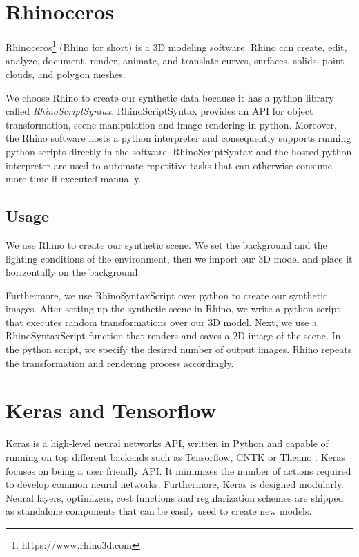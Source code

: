 \section{Rhinoceros}\label{sec:rhino}
Rhinoceros\footnote{https://www.rhino3d.com} (Rhino for short) is a 3D modeling software. Rhino can create, edit, analyze, document, render, animate, and translate curves, surfaces, solids, point clouds, and polygon meshes.

We choose Rhino to create our synthetic data because it has a python library called \textit{RhinoScriptSyntax}. RhinoScriptSyntax provides an API for object transformation, scene manipulation and image rendering in python. Moreover, the Rhino software hosts a python interpreter and consequently supports running python scripts directly in the software. RhinoScriptSyntax and the hosted python interpreter are used to automate repetitive tasks that can otherwise consume more time if executed manually.

\subsection{Usage}
We use Rhino to create our synthetic scene. We set the background and the lighting conditions of the environment, then we import our 3D model and place it horizontally on the background.

Furthermore, we use RhinoSyntaxScript over python to create our synthetic images. After setting up the synthetic scene in Rhino, we write a python script that executes random transformations over our 3D model. Next, we use a RhinoSyntaxScript function that renders and saves a 2D image of the scene. In the python script, we specify the desired number of output images. Rhino repeats the transformation and rendering process accordingly.

\section{Keras and Tensorflow}\label{sec:keras}
Keras is a high-level neural networks API, written in Python and capable of running on top different backends such as Tensorflow, CNTK or Theano \cite{chollet2015keras}. Keras focuses on being a user friendly API. It minimizes the number of actions required to develop common neural networks. Furthermore, Keras is designed modularly. Neural layers, optimizers, cost functions and regularization schemes are shipped as standalone components that can be easily used to create new models.

